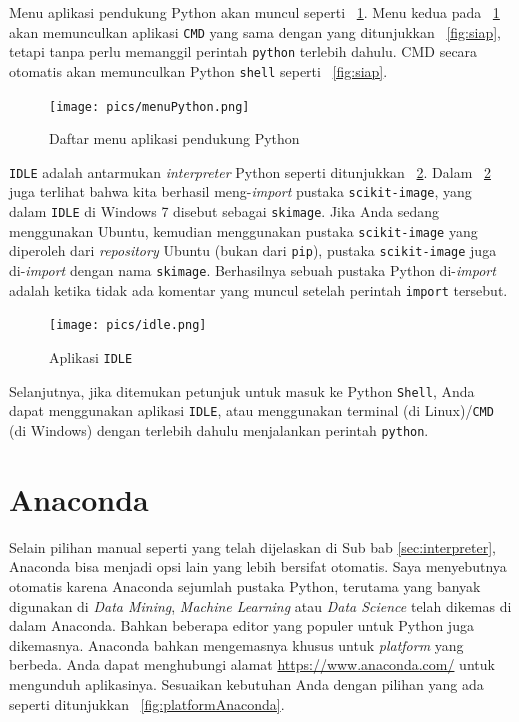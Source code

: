 Menu aplikasi pendukung Python akan muncul seperti \figurename~\ref{fig:menu}. Menu kedua pada \figurename~\ref{fig:menu} akan memunculkan aplikasi \texttt{CMD} yang sama dengan yang ditunjukkan \figurename~\ref{fig:siap}, tetapi tanpa perlu memanggil perintah \texttt{python} terlebih dahulu. CMD secara otomatis akan memunculkan Python \texttt{shell} seperti \figurename~\ref{fig:siap}.

\begin{figure}[h!]
  \begin{center}
    \texttt{[image: pics/menuPython.png]}
    \caption{Daftar menu aplikasi pendukung Python}
    \label{fig:menu}
  \end{center}
\end{figure}

\texttt{IDLE} adalah antarmukan \textit{interpreter} Python seperti ditunjukkan \figurename~\ref{fig:idle}. Dalam \figurename~\ref{fig:idle} juga terlihat bahwa kita berhasil meng-\textit{import} pustaka \texttt{scikit-image}, yang dalam \texttt{IDLE} di Windows 7 disebut sebagai \texttt{skimage}. Jika Anda sedang menggunakan Ubuntu, kemudian menggunakan pustaka \texttt{scikit-image} yang diperoleh dari \textit{repository} Ubuntu (bukan dari \texttt{pip}), pustaka \texttt{scikit-image} juga di-\textit{import} dengan nama \texttt{skimage}. Berhasilnya sebuah pustaka Python di-\textit{import} adalah ketika tidak ada komentar yang muncul setelah perintah \texttt{import} tersebut.

\begin{figure}
  \begin{center}
    \texttt{[image: pics/idle.png]}
    \caption{Aplikasi \texttt{IDLE}}
    \label{fig:idle}
  \end{center}
\end{figure}

Selanjutnya, jika ditemukan petunjuk untuk masuk ke Python \texttt{Shell}, Anda dapat menggunakan aplikasi \texttt{IDLE}\texttt{}, atau menggunakan terminal (di Linux)/\texttt{CMD} (di Windows) dengan terlebih dahulu menjalankan perintah \texttt{python}.

\section{Anaconda}
Selain pilihan manual seperti yang telah dijelaskan di Sub bab \ref{sec:interpreter}, Anaconda bisa menjadi opsi lain yang lebih bersifat otomatis. Saya menyebutnya otomatis karena Anaconda sejumlah pustaka Python, terutama yang banyak digunakan di \textit{Data Mining}, \textit{Machine Learning} atau \textit{Data Science} telah dikemas di dalam Anaconda. Bahkan beberapa editor yang populer untuk Python juga dikemasnya. Anaconda bahkan mengemasnya khusus untuk \textit{platform} yang berbeda. Anda dapat menghubungi alamat \url{https://www.anaconda.com/} untuk mengunduh aplikasinya. Sesuaikan kebutuhan Anda dengan pilihan yang ada seperti ditunjukkan \figurename~\ref{fig:platformAnaconda}.

